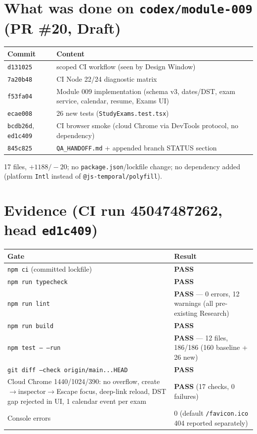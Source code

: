 \documentclass[11pt,a4paper]{article}
\newcommand{\sha}[1]{\texttt{\small #1}}
\newcommand{\PASS}{\textcolor{green!50!black}{\textbf{PASS}}}
\begin{document}
\section{What was done on \texttt{codex/module-009} (PR \#20, Draft)}
\begin{tabularx}{\textwidth}{@{}lX@{}}
\toprule
Commit & Content \\
\midrule
\sha{d131025} & scoped CI workflow (seen by Design Window) \\
\sha{7a20b48} & CI Node 22/24 diagnostic matrix \\
\sha{f53fa04} & Module 009 implementation (schema v3, dates/DST, exam service, calendar, resume, Exams UI) \\
\sha{ecae008} & 26 new tests (\texttt{StudyExams.test.tsx}) \\
\sha{bcdb26d}, \sha{ed1c409} & CI browser smoke (cloud Chrome via DevTools protocol, no dependency) \\
\sha{845c825} & \texttt{QA\_HANDOFF.md} + appended branch STATUS section \\
\bottomrule
\end{tabularx}
17 files, $+1188/-20$; no \texttt{package.json}/lockfile change; no dependency added (platform \texttt{Intl} instead of \texttt{@js-temporal/polyfill}).

\section{Evidence (CI run 45047487262, head \sha{ed1c409})}
\begin{tabularx}{\textwidth}{@{}Xl@{}}
\toprule
Gate & Result \\
\midrule
\texttt{npm ci} (committed lockfile) & \PASS \\
\texttt{npm run typecheck} & \PASS \\
\texttt{npm run lint} & \PASS{} --- 0 errors, 12 warnings (all pre-existing Research) \\
\texttt{npm run build} & \PASS \\
\texttt{npm test -- --run} & \PASS{} --- 12 files, 186/186 (160 baseline + 26 new) \\
\texttt{git diff --check origin/main...HEAD} & \PASS \\
Cloud Chrome 1440/1024/390: no overflow, create$\to$inspector$\to$Escape focus, deep-link reload, DST gap rejected in UI, 1 calendar event per exam & \PASS{} (17 checks, 0 failures) \\
Console errors & 0 (default \texttt{/favicon.ico} 404 reported separately) \\
\bottomrule
\end{tabularx}
\end{document}
